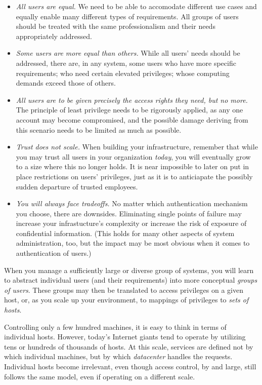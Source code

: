 \begin{itemize}
	\item {\em All users are equal.}  We need to be able to
		accomodate different use cases and equally enable many
		different types of requirements.  All groups of users
		should be treated with the same professionalism and their
		needs appropriately addressed.
	\item {\em Some users are more equal than others.}  While all
		users' needs should be addressed, there are, in any
		system, some users who have more specific requirements;
		who need certain elevated privileges; whose computing
		demands exceed those of others.
	\item {\em All users are to be given precisely the access rights
		they need, but no more.}  The principle of least privilege
		needs to be rigorously applied, as any one account may
		become compromised, and the possible damage deriving from
		this scenario needs to be limited as much as possible.
	\item {\em Trust does not scale.}  When building your
		infrastructure, remember that while you may trust all
		users in your organization {\em today}, you will
		eventually grow to a size where this no longer holds.  It
		is near impossible to later on put in place restrictions
		on users' privileges, just as it is to anticiapate the
		possibly sudden departure of trusted employees.
	\item {\em You will always face tradeoffs.}  No matter which
		authentication mechanism you choose, there are downsides.
		Eliminating single points of failure may increase your
		infrastucture's complexity or increase the risk of
		exposure of confidential information.  (This holds for
		many other aspects of system administration, too, but the
		impact may be most obvious when it comes to
		authentication of users.)
\end{itemize}

When you manage a sufficiently large or diverse group
of systems, you will learn to abstract individual
users (and their requirements) into more conceptual
{\em groups of users}.  These groups may then be
translated to access privileges on a given host, or,
as you scale up your environment, to mappings of
privileges to {\em sets of hosts}.

Controlling only a few hundred machines, it is easy to
think in terms of individual hosts.  However, today's
Internet giants tend to operate by utilizing tens or
hundreds of thousands of hosts.  At this scale,
services are defined not by which individual machines,
but by which {\em datacenter} handles the requests.
Individual hosts become irrelevant, even though access
control, by and large, still follows the same model,
even if operating on a different scale.

